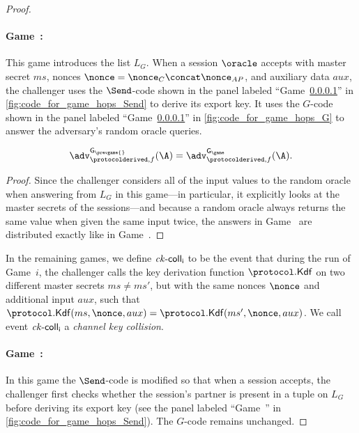 \begin{proof}
\newgame
\paragraph{Game~\game:} \label{game:introduce_L_G} 
This game introduces the list $L_G$.
When a session $\oracle$ accepts with master secret $ms$,
nonces $\nonce = \nonce_{C} \concat \nonce_{AP}$, and auxiliary data $aux$,
the challenger uses the $\Send$-code shown in the panel labeled ``Game~\ref{game:introduce_L_G}'' in \cref{fig:code_for_game_hops_Send} to derive its export key.
It uses the $G$-code shown in the panel labeled ``Game~\ref{game:introduce_L_G}'' in \cref{fig:code_for_game_hops_G} to answer the adversary's random oracle queries.

\vspace*{-\baselineskip}
\item 
\begin{claim}
\begin{equation}
	\adv_{\protocolderived,f}^{\mathsf{G_{\prevgame{}}}}(\A) 
		= \adv_{\protocolderived,f}^{\mathsf{G_\game}}(\A) .
\end{equation} 
\end{claim}

\begin{proof}
Since the challenger considers all of the input values to the random oracle when answering from $L_G$ in this game---in 
particular, 
it explicitly looks at the master secrets of the sessions---and because a random oracle always returns the same value when given the same input twice, 
the answers in Game~\game{} are distributed exactly like in Game~\prevgame{}.
\end{proof}









In the remaining games,
we define $\operatorname{\mathit{ck}-\mathsf{coll}}_\mathsf{i}$ to be the event that during the run of Game~$i$,
the challenger calls the key derivation function $\protocol.\mathsf{Kdf}$ on two different master secrets $ms \neq ms'$,
but with the same nonces $\nonce$ and additional input $aux$,
such that
$\protocol.\mathsf{Kdf}(ms, \nonce, aux) 
= \protocol.\mathsf{Kdf}(ms', \nonce, aux)$.
We call event $\operatorname{\mathit{ck}-\mathsf{coll}}_{\mathsf{i}}$ a \emph{channel key collision}.


\newgame
\paragraph{Game~\game:} \label{game:match_fresh_sessions} 
In this game the $\Send$-code  is modified so that when a session accepts,
the challenger first checks whether the session's partner is present in a tuple on $L_G$ 
before deriving its export key
(see the panel labeled ``Game~\game{}'' in \cref{fig:code_for_game_hops_Send}).
The $G$-code remains unchanged.


\end{proof}
